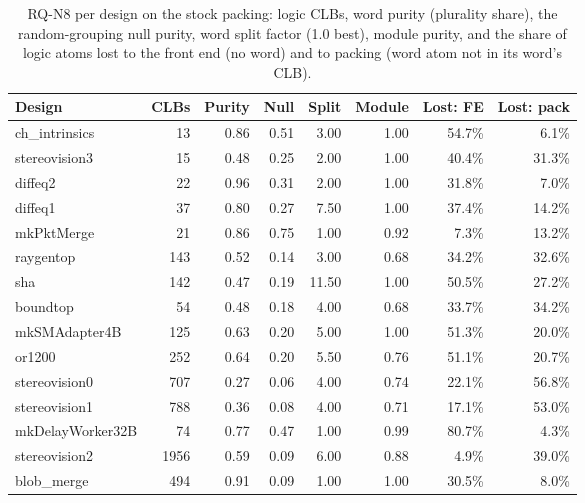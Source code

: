 \begin{table}[t]
\caption{RQ-N8 per design on the stock packing: logic CLBs, word purity (plurality share), the random-grouping null
purity, word split factor (1.0 best), module purity, and the share of logic atoms lost to the front end (no word) and to
packing (word atom not in its word's CLB).}
\label{tab:r3n8}
\centering
\footnotesize\setlength{\tabcolsep}{3pt}
\begin{tabular}{lrrrrrrr}
\toprule
Design & CLBs & Purity & Null & Split & Module & Lost: FE & Lost: pack \\
\midrule
ch\_intrinsics & 13 & 0.86 & 0.51 & 3.00 & 1.00 & 54.7\% & 6.1\% \\
stereovision3 & 15 & 0.48 & 0.25 & 2.00 & 1.00 & 40.4\% & 31.3\% \\
diffeq2 & 22 & 0.96 & 0.31 & 2.00 & 1.00 & 31.8\% & 7.0\% \\
diffeq1 & 37 & 0.80 & 0.27 & 7.50 & 1.00 & 37.4\% & 14.2\% \\
mkPktMerge & 21 & 0.86 & 0.75 & 1.00 & 0.92 & 7.3\% & 13.2\% \\
raygentop & 143 & 0.52 & 0.14 & 3.00 & 0.68 & 34.2\% & 32.6\% \\
sha & 142 & 0.47 & 0.19 & 11.50 & 1.00 & 50.5\% & 27.2\% \\
boundtop & 54 & 0.48 & 0.18 & 4.00 & 0.68 & 33.7\% & 34.2\% \\
mkSMAdapter4B & 125 & 0.63 & 0.20 & 5.00 & 1.00 & 51.3\% & 20.0\% \\
or1200 & 252 & 0.64 & 0.20 & 5.50 & 0.76 & 51.1\% & 20.7\% \\
stereovision0 & 707 & 0.27 & 0.06 & 4.00 & 0.74 & 22.1\% & 56.8\% \\
stereovision1 & 788 & 0.36 & 0.08 & 4.00 & 0.71 & 17.1\% & 53.0\% \\
mkDelayWorker32B & 74 & 0.77 & 0.47 & 1.00 & 0.99 & 80.7\% & 4.3\% \\
stereovision2 & 1956 & 0.59 & 0.09 & 6.00 & 0.88 & 4.9\% & 39.0\% \\
blob\_merge & 494 & 0.91 & 0.09 & 1.00 & 1.00 & 30.5\% & 8.0\% \\
\bottomrule
\end{tabular}
\end{table}

